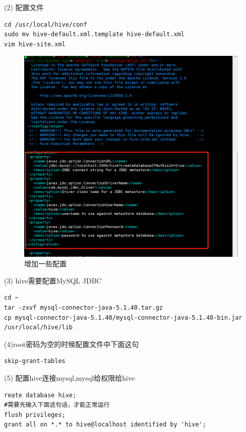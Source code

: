 \documentclass[12pt]{article}
\begin{document}
\newpage
(2) 配置文件

\begin{lstlisting}[language={[ANSI]C}]
cd /usr/local/hive/conf
sudo mv hive-default.xml.template hive-default.xml
vim hive-site.xml
\end{lstlisting}

\begin{figure}[ht]
\centering
\includegraphics[scale=0.7]{figures/8.png}
\caption{增加一些配置}\label{fig:label2}
\end{figure}

(3) hive需要配置MySQL JDBC
\begin{lstlisting}[language={[ANSI]C}]
cd ~
tar -zxvf mysql-connector-java-5.1.40.tar.gz
cp mysql-connector-java-5.1.40/mysql-connector-java-5.1.40-bin.jar  /usr/local/hive/lib
\end{lstlisting}

(4)root密码为空的时候配置文件中下面这句
\begin{lstlisting}[language={[ANSI]C}]
skip-grant-tables
\end{lstlisting}

\newpage
(5) 配置hive连接mysql,mysql给权限给hive
\begin{lstlisting}[language={[ANSI]C}]
reate database hive;
#需要先输入下面这句话，才能正常运行
flush privileges;
grant all on *.* to hive@localhost identified by 'hive';
\end{lstlisting}
\end{document}
